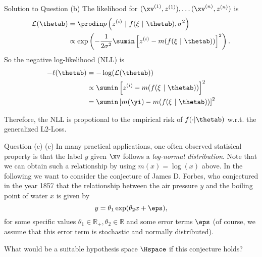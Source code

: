 \documentclass[aspectratio=169]{beamer}
\newcommand{\myi}{m(\yi)}
\newcommand{\zi}{z^{(i)}}
\begin{document}
\begin{frame}{Solution to Question (b)}
	\small
	The likelihood for  $(\xv^{(1)}, z^{(1)}), \ldots (\xv^{(n)}, z^{(n)})$ is 
	\begin{align*}
		\mathcal{L}(\thetab) 
		&= \prodin p \left( \zi \ | \ f(\xi \ | \ \thetab), \sigma^2 \right)  \\
		&\propto \exp \left( -\frac{1}{2\sigma^2} \sumin \left[ \zi - m(f(\xi \ | \ \thetab)) \right]^2 \right).
	\end{align*}
	So the negative log-likelihood (NLL) is 
	\begin{align*}
		- \ell(\thetab) 
		&= - \log(\mathcal{L}(\thetab))\\
		&\propto \sumin  \left[ \zi - m(f(\xi \ | \ \thetab)) \right]^2 \\
		&= \sumin  \left[ \myi - m(f(\xi \ | \ \thetab)) \right]^2 
	\end{align*}
	
	Therefore, the NLL is propotional to the empirical risk of $f(\cdot | \thetab)$ w.r.t. the generalized L2-Loss.
\end{frame}

\begin{frame}{Question (c)}
	(c) In many practical applications, one often observed statisical property is that the label $y$ given $\xv$ follows a \emph{log-normal distribution}. Note that we can obtain such a relationship by using $m(x) = \log(x)$ above. In the following we want to consider the conjecture of James D. Forbes, who conjectured in the year 1857 that the relationship between the air pressure $y$ and the boiling point of water $x$ is given by $$y = \theta_1 \exp(\theta_2 x + \eps),$$ for some specific values $\theta_1 \in \mathbb{R}_+, \theta_2 \in \mathbb{R}$ and some error terms $\eps$ (of course, we assume that this error term is stochastic and normally distributed).
	
	What would be a suitable hypothesis space $\Hspace$ if this conjecture holds?
\end{frame}
\end{document}
